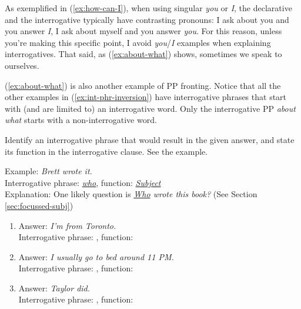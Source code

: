 As exemplified in (\ref{ex:how-can-I}), when using singular \textit{you} or \textit{I}, the declarative and the interrogative typically have contrasting pronouns: I ask about you and you answer \textit{I}, I ask about myself and you answer \textit{you}. For this reason, unless you're making this specific point, I avoid \textit{you}/\textit{I} examples when explaining interrogatives. That said, as (\ref{ex:about-what}) shows, sometimes we speak to ourselves.

(\ref{ex:about-what}) is also another example of PP fronting. Notice that all the other examples in (\ref{ex:int-phr-inversion}) have interrogative phrases that start with (and are limited to) an interrogative word. Only the interrogative PP \textit{about what} starts with a non-interrogative word.

    \begin{tcolorbox}[title=Practice, colback=white, parbox]
        \setlength{\parindent}{1.5em}
        \noindent 
        Identify an interrogative phrase that would result in the given answer, and state its function in the interrogative clause. See the example.

        \phantom{x}

        Example: \textit{Brett wrote it.}\\
        \phantom{xxx}Interrogative phrase: \uline{\textsf{\textit{who}}}, function: \uline{\textsf{\textit{Subject}}}\\
        \phantom{xxx}Explanation: One likely question is \textit{\uline{Who} wrote this book?} (See Section \ref{sec:focussed-subj})

        \begin{enumerate}[noitemsep]
            \item Answer: \textit{I'm from Toronto.}\\
            Interrogative phrase: \uline{\phantom{xxxxxxxxxx}}, function: \uline{\phantom{xxxxxxxxxx}}
            
            \item Answer: \textit{I usually go to bed around 11 PM.}\\
            Interrogative phrase: \uline{\phantom{xxxxxxxxxx}}, function: \uline{\phantom{xxxxxxxxxx}}

            \item Answer: \textit{Taylor did.}\\
            Interrogative phrase: \uline{\phantom{xxxxxxxxxx}}, function: \uline{\phantom{xxxxxxxxxx}}


\end{enumerate}
\end{tcolorbox}
